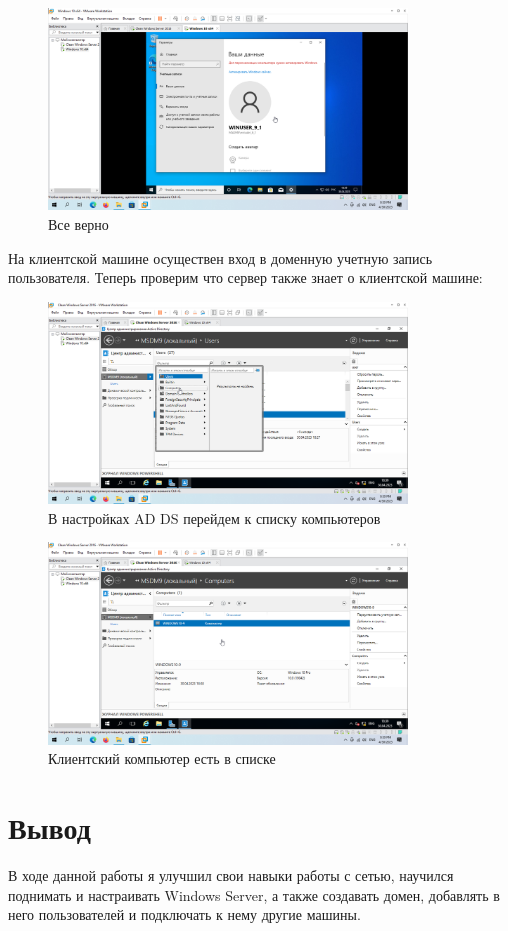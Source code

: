 \documentclass[a4paper]{article}
\begin{document}
  \begin{figure}[H]
    \centering
    \includegraphics[width=0.85\textwidth]{Screenshot_118}
    \caption{Все верно}
    \label{img:118}
  \end{figure}

  На клиентской машине осуществен вход в доменную учетную запись пользователя.
  Теперь проверим что сервер также знает о клиентской машине:

  \begin{figure}[H]
    \centering
    \includegraphics[width=0.85\textwidth]{Screenshot_119}
    \caption{В настройках AD DS перейдем к списку компьютеров}
    \label{img:119}
  \end{figure}

  \begin{figure}[H]
    \centering
    \includegraphics[width=0.85\textwidth]{Screenshot_120}
    \caption{Клиентский компьютер есть в списке}
    \label{img:120}
  \end{figure}

  \section{Вывод}

  В ходе данной работы я улучшил свои навыки работы с сетью, научился поднимать и настраивать Windows
  Server, а также создавать домен, добавлять в него пользователей и подключать к нему другие машины.
\end{document}
